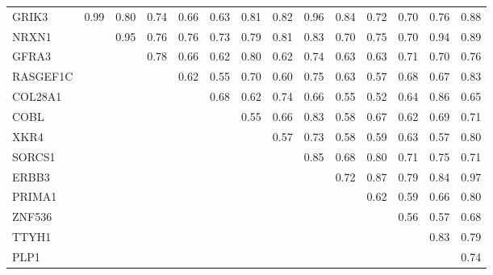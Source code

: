 \begin{longtable}{lrrrrrrrrrrrrr}
\bottomrule
\endlastfoot
GRIK3    &        0.99 &        0.80 &           0.74 &          0.66 &       0.63 &       0.81 &         0.82 &        0.96 &         0.84 &         0.72 &        0.70 &       0.76 &        0.88 \\
NRXN1    &             &        0.95 &           0.76 &          0.76 &       0.73 &       0.79 &         0.81 &        0.83 &         0.70 &         0.75 &        0.70 &       0.94 &        0.89 \\
GFRA3    &             &             &           0.78 &          0.66 &       0.62 &       0.80 &         0.62 &        0.74 &         0.63 &         0.63 &        0.71 &       0.70 &        0.76 \\
RASGEF1C &             &             &                &          0.62 &       0.55 &       0.70 &         0.60 &        0.75 &         0.63 &         0.57 &        0.68 &       0.67 &        0.83 \\
COL28A1  &             &             &                &               &       0.68 &       0.62 &         0.74 &        0.66 &         0.55 &         0.52 &        0.64 &       0.86 &        0.65 \\
COBL     &             &             &                &               &            &       0.55 &         0.66 &        0.83 &         0.58 &         0.67 &        0.62 &       0.69 &        0.71 \\
XKR4     &             &             &                &               &            &            &         0.57 &        0.73 &         0.58 &         0.59 &        0.63 &       0.57 &        0.80 \\
SORCS1   &             &             &                &               &            &            &              &        0.85 &         0.68 &         0.80 &        0.71 &       0.75 &        0.71 \\
ERBB3    &             &             &                &               &            &            &              &             &         0.72 &         0.87 &        0.79 &       0.84 &        0.97 \\
PRIMA1   &             &             &                &               &            &            &              &             &              &         0.62 &        0.59 &       0.66 &        0.80 \\
ZNF536   &             &             &                &               &            &            &              &             &              &              &        0.56 &       0.57 &        0.68 \\
TTYH1    &             &             &                &               &            &            &              &             &              &              &             &       0.83 &        0.79 \\
PLP1     &             &             &                &               &            &            &              &             &              &              &             &            &        0.74 \\
\end{longtable}


